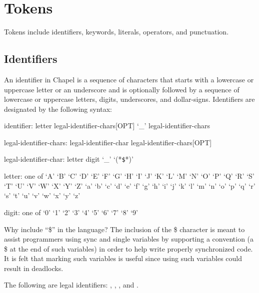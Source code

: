 \section{Tokens}
\label{Tokens}

Tokens include identifiers, keywords, literals, operators, and
punctuation.

\subsection{Identifiers}
\label{Identifiers}

An identifier in Chapel is a sequence of characters that starts with a
lowercase or uppercase letter or an underscore and is optionally
followed by a sequence of lowercase or uppercase letters, digits,
underscores, and dollar-signs.  Identifiers are designated by the
following syntax:
\begin{syntax}
identifier:
  letter legal-identifier-chars[OPT]
  `_' legal-identifier-chars

legal-identifier-chars:
  legal-identifier-char legal-identifier-chars[OPT]

legal-identifier-char:
  letter
  digit
  `_'
  `(*\texttt{\$}*)'

letter: one of
  `A' `B' `C' `D' `E' `F' `G' `H' `I' `J' `K' `L' `M' `N' `O' `P' `Q' `R' `S' `T' `U' `V' `W' `X' `Y' `Z' `a' `b' `c' `d' `e' `f' `g' `h' `i' `j' `k' `l' `m'
                           `n' `o' `p' `q' `r' `s' `t' `u' `v' `w' `x' `y' `z'

digit: one of
  `0' `1' `2' `3' `4' `5' `6' `7' `8' `9'
\end{syntax}

\begin{rationale}
Why include ``\$'' in the language?  The inclusion of the \$ character
is meant to assist programmers using sync and single variables by
supporting a convention (a \$ at the end of such variables) in order
to help write properly synchronized code.  It is felt that marking
such variables is useful since using such variables could result in
deadlocks.
\end{rationale}

\begin{example}
The following are legal
identifiers: , ,
, and .
\end{example}

